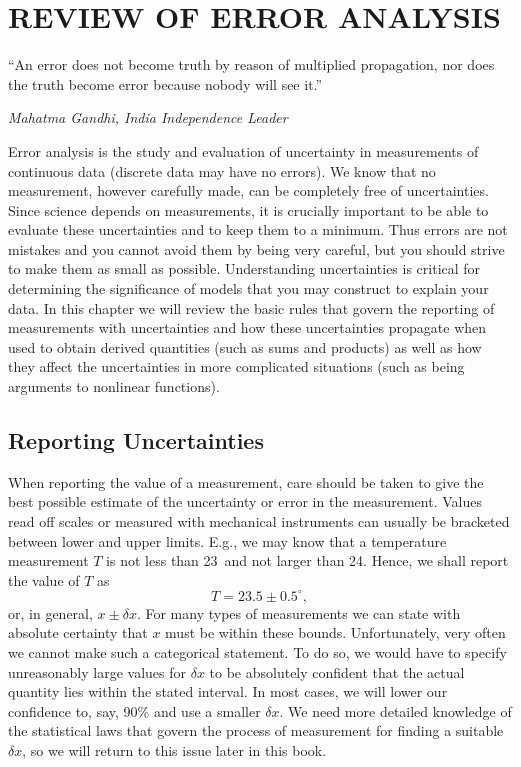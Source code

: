 %
\chapter{REVIEW OF ERROR ANALYSIS}
\label{ch:error}
\epigraph{``An error does not become truth by reason of multiplied propagation, nor does the truth become error because nobody will see it.''}{\textit{Mahatma Gandhi, India Independence Leader}}

	Error analysis is the study and evaluation of uncertainty in measurements of continuous data 
(discrete data may have no errors).  We know that no measurement, however carefully made, 
can be completely free of uncertainties.  Since science depends on measurements, it is 
crucially important to be able to evaluate these uncertainties and to keep them to a minimum.  
Thus errors are not mistakes and you cannot avoid them by being very careful, but you should strive to make them 
as small as possible.  Understanding uncertainties is critical for determining the significance of models
that you may construct to explain your data.  In this chapter we will review the basic rules that govern
the reporting of measurements with uncertainties and how these uncertainties propagate when used to
obtain derived quantities (such as sums and products) as well as how they affect the uncertainties in
more complicated situations (such as being arguments to nonlinear functions).

\section{Reporting Uncertainties}

	When reporting the value of a measurement, care should be taken to give the best possible 
estimate of the uncertainty or error in the measurement.  Values read off scales or measured with 
mechanical instruments can usually be bracketed between lower and upper limits.  E.g., we may know
that a temperature measurement $T$ is not less  than 23\DS\ and not larger than 24\DS.  Hence, we
shall report the value of $T$ as
\begin{equation}
T = 23.5 \pm 0.5^{\circ},
\end{equation}
or, in general, $x \pm \delta x$.  For many types of measurements we can state with absolute certainty that 
$x$ must be within these bounds.  Unfortunately, very often we cannot make such a categorical 
statement.  To do so, we would have to specify unreasonably large values for $\delta x$ to be absolutely confident that 
the actual quantity lies within the stated interval.  In most cases, we will lower our confidence to, 
say, 90\% and use a smaller $\delta x$.  We need more detailed knowledge of the statistical laws that 
govern the process of measurement for finding a suitable $\delta x$, so we will return to this issue later in this book.

